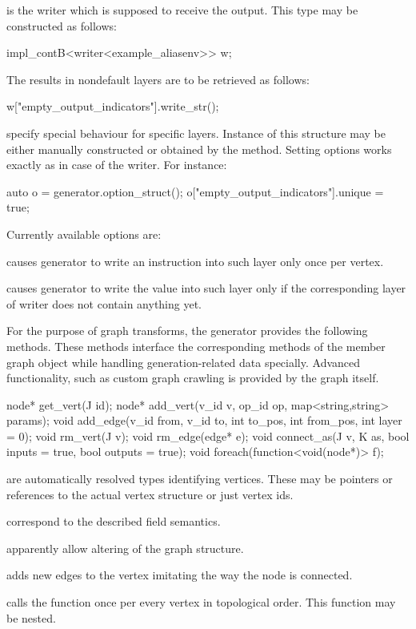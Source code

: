 \begin{description}
\item {} is the writer which is supposed to receive the output. This type may be constructed as follows:
\begin{code}
impl_contB<writer<example_aliasenv>> w;
\end{code}
 The results in nondefault layers are to be retrieved as follows:
\begin{code}
w["empty_output_indicators"].write_str();
\end{code}
\item {} specify special behaviour for specific layers. Instance of this structure may be either manually constructed or obtained by the  method. Setting options works exactly as in case of the writer. For instance:
\begin{code}
auto o = generator.option_struct();
o["empty_output_indicators"].unique = true;
\end{code}
Currently available options are:
\begin{description}
\item {} causes generator to write an instruction into such layer only once per vertex.
\item {} causes generator to write the value into such layer only if the corresponding layer of writer does not contain anything yet.
\end{description}
\end{description}

For the purpose of graph transforms, the generator provides the following methods. These methods interface the corresponding methods of the member graph object while handling generation-related data specially. Advanced functionality, such as custom graph crawling is provided by the graph itself.
\begin{code}
node* get_vert(J id);
node* add_vert(v_id v, op_id op, map<string,string> params);
void add_edge(v_id from, v_id to, int to_pos, int from_pos, int layer = 0);
void rm_vert(J v);
void rm_edge(edge* e);
void connect_as(J v, K as, bool inputs = true, bool outputs = true);
void foreach(function<void(node*)> f);
\end{code}

\begin{description}
  \item {} are automatically resolved types identifying vertices. These may be pointers or references to the actual vertex structure or just vertex ids.
  \item {} correspond to the described field semantics.
  \item {} apparently allow altering of the graph structure.
  \item {} adds new edges to the vertex  imitating the way the  node is connected.
  \item {} calls the function  once per every vertex in topological order. This function may be nested.
\end{description}

